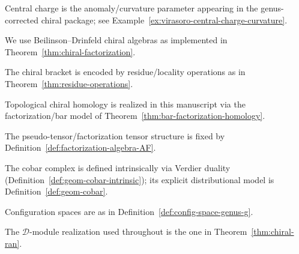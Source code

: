 \begin{definition}\label{def:central-charge}
Central charge is the anomaly/curvature parameter appearing in the genus-corrected chiral package; see Example~\ref{ex:virasoro-central-charge-curvature}.
\end{definition}

\begin{definition}\label{def:chiral-algebra-bd}
We use Beilinson--Drinfeld chiral algebras as implemented in Theorem~\ref{thm:chiral-factorization}.
\end{definition}

\begin{construction}\label{constr:chiral-bracket}
The chiral bracket is encoded by residue/locality operations as in Theorem~\ref{thm:residue-operations}.
\end{construction}

\begin{definition}\label{def:topological-chiral-homology}
Topological chiral homology is realized in this manuscript via the factorization/bar model of Theorem~\ref{thm:bar-factorization-homology}.
\end{definition}

\begin{definition}\label{def:chiral-pseudo-tensor}
The pseudo-tensor/factorization tensor structure is fixed by Definition~\ref{def:factorization-algebra-AF}.
\end{definition}

\begin{definition}\label{def:cobar-coalgebra}
The cobar complex is defined intrinsically via Verdier duality
(Definition~\ref{def:geom-cobar-intrinsic}); its explicit distributional
model is Definition~\ref{def:geom-cobar}.
\end{definition}

\begin{definition}\label{def:config-space}
Configuration spaces are as in Definition~\ref{def:config-space-genus-g}.
\end{definition}

\begin{definition}\label{def:dmod-classical}
The \(\mathcal{D}\)-module realization used throughout is the one in Theorem~\ref{thm:chiral-ran}.
\end{definition}

